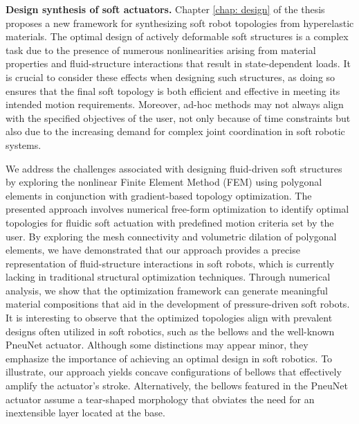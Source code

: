 

\textbf{Design synthesis of soft actuators. } Chapter \ref{chap: design} of the thesis proposes a new framework for synthesizing soft robot topologies from hyperelastic materials. The optimal design of actively deformable soft structures is a complex task due to the presence of numerous nonlinearities arising from material properties and fluid-structure interactions that result in state-dependent loads. It is crucial to consider these effects when designing such structures, as doing so ensures that the final soft topology is both efficient and effective in meeting its intended motion requirements. Moreover, ad-hoc methods may not always align with the specified objectives of the user, not only because of time constraints but also due to the increasing demand for complex joint coordination in soft robotic systems.

We address the challenges associated with designing fluid-driven soft structures by exploring the nonlinear Finite Element Method (FEM) using polygonal elements in conjunction with gradient-based topology optimization. The presented approach involves numerical free-form optimization to identify optimal topologies for fluidic soft actuation with predefined motion criteria set by the user. By exploring the mesh connectivity and volumetric dilation of polygonal elements, we have demonstrated that our approach provides a precise representation of fluid-structure interactions in soft robots, which is currently lacking in traditional structural optimization techniques. Through numerical analysis, we show that the optimization framework can generate meaningful material compositions that aid in the development of pressure-driven soft robots. It is interesting to observe that the optimized topologies align with prevalent designs often utilized in soft robotics, such as the bellows and the well-known PneuNet actuator. Although some distinctions may appear minor, they emphasize the importance of achieving an optimal design in soft robotics. To illustrate, our approach yields concave configurations of bellows that effectively amplify the actuator's stroke. Alternatively, the bellows featured in the PneuNet actuator assume a tear-shaped morphology that obviates the need for an inextensible layer located at the base. \\[0.05em]

